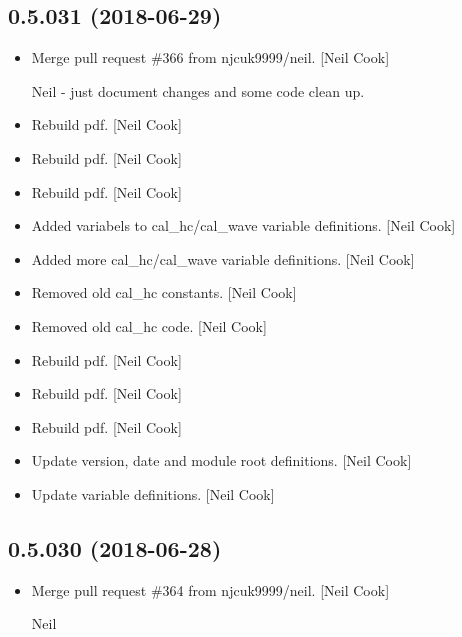 \documentclass[a4paper,10pt,english]{report}
\begin{document}
\subsection{0.5.031 (2018-06-29)}
\label{\detokenize{misc/changelog:id403}}\begin{itemize}
\item {} 
Merge pull request \#366 from njcuk9999/neil. {[}Neil Cook{]}

Neil - just document changes and some code clean up.

\item {} 
Rebuild pdf. {[}Neil Cook{]}

\item {} 
Rebuild pdf. {[}Neil Cook{]}

\item {} 
Rebuild pdf. {[}Neil Cook{]}

\item {} 
Added variabels to cal\_hc/cal\_wave variable definitions. {[}Neil Cook{]}

\item {} 
Added more cal\_hc/cal\_wave variable definitions. {[}Neil Cook{]}

\item {} 
Removed old cal\_hc constants. {[}Neil Cook{]}

\item {} 
Removed old cal\_hc code. {[}Neil Cook{]}

\item {} 
Rebuild pdf. {[}Neil Cook{]}

\item {} 
Rebuild pdf. {[}Neil Cook{]}

\item {} 
Rebuild pdf. {[}Neil Cook{]}

\item {} 
Update version, date and module root definitions. {[}Neil Cook{]}

\item {} 
Update variable definitions. {[}Neil Cook{]}

\end{itemize}


\subsection{0.5.030 (2018-06-28)}
\label{\detokenize{misc/changelog:id404}}\begin{itemize}
\item {} 
Merge pull request \#364 from njcuk9999/neil. {[}Neil Cook{]}

Neil

\end{itemize}
\end{document}
